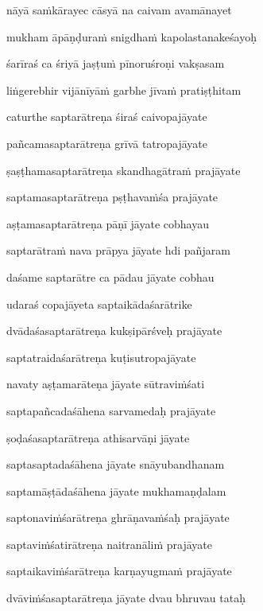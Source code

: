 nāyā saṁkārayec cāsyā na caivam avamānayet\thinspace{\dandab} \dontdisplaylinenum

mukham āpāṇḍuraṁ snigdhaṁ kapolastanakeśayoḥ \veg\dontdisplaylinenum

śarīraś ca śriyā jaṣṭuṁ pīnoruśroṇi vakṣasam\thinspace{\dandab} \dontdisplaylinenum

liṅgerebhir vijānīyāṁ garbhe jīvaṁ pratiṣṭhitam \veg\dontdisplaylinenum

caturthe saptarātreṇa śiraś caivopajāyate\thinspace{\dandab} \dontdisplaylinenum

pañcamasaptarātreṇa grīvā tatropajāyate \veg\dontdisplaylinenum

ṣaṣṭhamasaptarātreṇa skandhagātraṁ prajāyate\thinspace{\dandab} \dontdisplaylinenum

saptamasaptarātreṇa pṣṭhavaṁśa prajāyate \veg\dontdisplaylinenum

aṣṭamasaptarātreṇa pāṇī jāyate cobhayau\thinspace{\dandab} \dontdisplaylinenum

saptarātraṁ nava prāpya jāyate hdi pañjaram \veg\dontdisplaylinenum

daśame saptarātre ca pādau jāyate cobhau\thinspace{\dandab} \dontdisplaylinenum

udaraś copajāyeta saptaikādaśarātrike \veg\dontdisplaylinenum

dvādaśasaptarātreṇa kukṣipārśveḥ prajāyate\thinspace{\dandab} \dontdisplaylinenum

saptatraidaśarātreṇa kuṭisutropajāyate \veg\dontdisplaylinenum

navaty aṣṭamarāteṇa jāyate sūtraviṁśati\thinspace{\dandab} \dontdisplaylinenum

saptapañcadaśāhena sarvamedaḥ prajāyate \veg\dontdisplaylinenum

ṣoḍaśasaptarātreṇa athisarvāṇi jāyate\thinspace{\dandab} \dontdisplaylinenum

saptasaptadaśāhena jāyate snāyubandhanam \veg\dontdisplaylinenum

saptamāṣṭādaśāhena jāyate mukhamaṇḍalam\thinspace{\dandab} \dontdisplaylinenum

saptonaviṁśarātreṇa ghrāṇavaṁśaḥ prajāyate \veg\dontdisplaylinenum

saptaviṁśatirātreṇa naitranāliṁ prajāyate\thinspace{\dandab} \dontdisplaylinenum

saptaikaviṁśarātreṇa karṇayugmaṁ prajāyate \veg\dontdisplaylinenum

dvāviṁśasaptarātreṇa jāyate dvau bhruvau tataḥ\thinspace{\dandab} \dontdisplaylinenum


